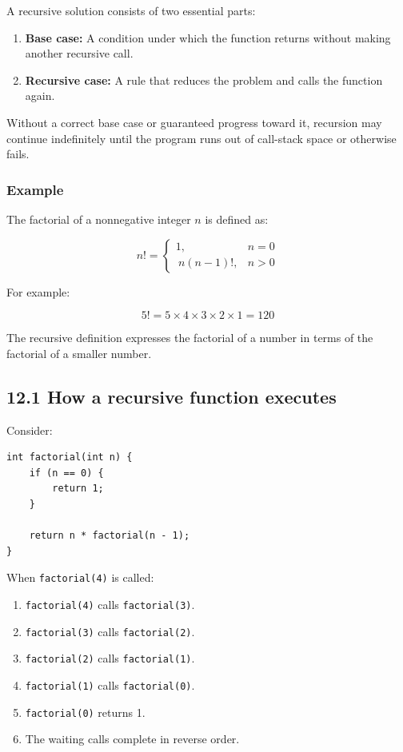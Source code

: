 A recursive solution consists of two essential parts:

\begin{enumerate}
    \item \textbf{Base case:} A condition under which the function returns without making another recursive call.
    \item \textbf{Recursive case:} A rule that reduces the problem and calls the function again.
\end{enumerate}

Without a correct base case or guaranteed progress toward it, recursion may continue indefinitely until the program runs out of call-stack space or otherwise fails.

\subsubsection{Example}

The factorial of a nonnegative integer $n$ is defined as:


\[
n!= \begin{cases} 1, & n=0\\\ n(n-1)!, & n>0 \end{cases}
\]


For example:


\[
5!=5\times4\times3\times2\times1=120
\]


The recursive definition expresses the factorial of a number in terms of the factorial of a smaller number.

\subsection{12.1 How a recursive function executes}

Consider:

\begin{lstlisting}[style=cppstyle]
int factorial(int n) {
    if (n == 0) {
        return 1;
    }

    return n * factorial(n - 1);
}
\end{lstlisting}

When \texttt{factorial(4)} is called:

\begin{enumerate}
    \item \texttt{factorial(4)} calls \texttt{factorial(3)}.
    \item \texttt{factorial(3)} calls \texttt{factorial(2)}.
    \item \texttt{factorial(2)} calls \texttt{factorial(1)}.
    \item \texttt{factorial(1)} calls \texttt{factorial(0)}.
    \item \texttt{factorial(0)} returns 1.
    \item The waiting calls complete in reverse order.
\end{enumerate}

